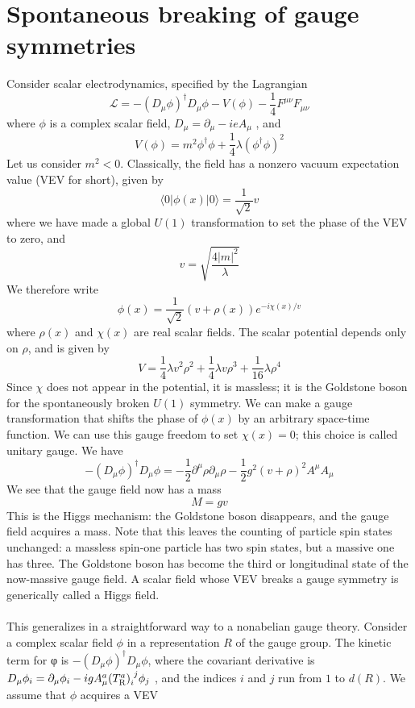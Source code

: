 \section{Spontaneous breaking of gauge symmetries}
Consider scalar electrodynamics, specified by the Lagrangian
\[\mathcal{L} = -(D_{\mu}\phi)^{\dagger}D_{\mu}\phi - V(\phi) - \frac{1}{4}F^{\mu\nu}F_{\mu\nu}\]
where $\phi$ is a complex scalar field, $D_{\mu} = \partial_{\mu} - ieA_{\mu}$ , and
\[V(\phi) = m^2\phi^{\dagger}\phi + \frac{1}{4}\lambda (\phi^{\dagger}\phi)^2\]
Let us consider $m^2 < 0$. Classically, the field has a nonzero vacuum expectation value (VEV for short), given by
\[\langle 0 | \phi(x) | 0 \rangle = \frac{1}{\sqrt{2}}v\]
where we have made a global $U(1)$ transformation to set the phase of the VEV to zero, and
\[v = \sqrt{\frac{4|m|^2}{\lambda}}\]
We therefore write
\[\phi(x) = \frac{1}{\sqrt{2}} (v + \rho(x)) e^{-i\chi(x)/v}\]
where $\rho(x)$ and $\chi(x)$ are real scalar fields. The scalar potential depends only on $\rho$, and is given by
\[V = \frac{1}{4}\lambda v^2\rho^2 + \frac{1}{4}\lambda v \rho^3 + \frac{1}{16}\lambda \rho^4\]
Since $\chi$ does not appear in the potential, it is massless; it is the Goldstone boson for the spontaneously broken $U(1)$ symmetry.
We can make a gauge transformation that shifts the phase of $\phi(x)$ by an arbitrary space-time function.
We can use this gauge freedom to set $\chi(x) = 0$; this choice is called unitary gauge.
We have
\[-(D_{\mu}\phi)^{\dagger}D_{\mu}\phi = -\frac{1}{2}\partial^{\mu}\rho \partial_{\mu}\rho - \frac{1}{2}g^2(v+\rho)^2 A^{\mu}A_{\mu}\]
We see that the gauge field now has a mass
\[M = gv\]
This is the Higgs mechanism: the Goldstone boson disappears, and the gauge field acquires a mass. Note that this leaves the counting of particle spin states unchanged: a massless spin-one particle has two spin states, but a massive
one has three. The Goldstone boson has become the third or longitudinal state of the now-massive gauge field. A scalar field whose VEV breaks a gauge symmetry is generically called a Higgs field.
\\ \\
This generalizes in a straightforward way to a nonabelian gauge theory. Consider a complex scalar field $\phi$ in a representation $R$ of the gauge group.
The kinetic term for φ is $-(D_{\mu}\phi)^{\dagger}D_{\mu}\phi$, where the covariant derivative is $D_{\mu}\phi_i = \partial_{\mu}\phi_i - igA^a_{\mu}(T^a_{\rm R})_{i}^{\phantom{i}j} \phi_j$ , and the indices $i$ and $j$ run from $1$ to $d(R)$.
We assume that $\phi$ acquires a VEV
